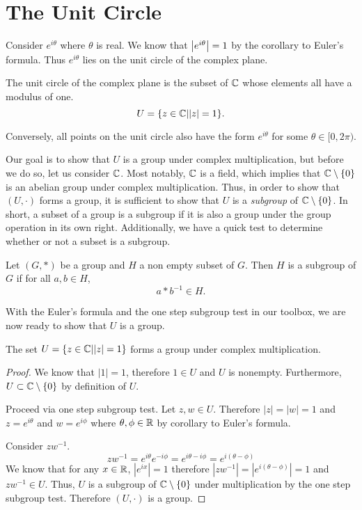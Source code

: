 \documentclass[notitlepage]{simple}
\begin{document}
\section{The Unit Circle}

Consider $e^{i\theta}$ where $\theta$ is real.
We know that $\left| e^{i\theta} \right|=1$ by the corollary to Euler's formula.
Thus $e^{i\theta}$ lies on the unit circle of the complex plane.
\begin{definition}
	The unit circle of the complex plane is the subset of $\mathbb{C}$ whose elements all have a modulus of one.
	\[
		U = \lbrace z\in\mathbb{C} | |z|=1 \rbrace.
	\]
\end{definition}
Conversely, all points on the unit circle also have the form $e^{i\theta}$ for some $\theta\in[0,2\pi)$.

Our goal is to show that $U$ is a group under complex multiplication, but before we do so, let us consider $\mathbb{C}$.
Most notably, $\mathbb{C}$ is a field, which implies that $\mathbb{C}\setminus\lbrace 0 \rbrace$ is an abelian group under complex multiplication.
Thus, in order to show that $(U,\cdot)$ forms a group, it is sufficient to show that $U$ is a \textit{subgroup} of $\mathbb{C}\setminus\lbrace 0 \rbrace$.
In short, a subset of a group is a subgroup if it is also a group under the group operation in its own right.
Additionally, we have a quick test to determine whether or not a subset is a subgroup.

\begin{proposition}
	Let $(G,*)$ be a group and $H$ a non empty subset of $G$.
	Then $H$ is a subgroup of $G$ if for all $a,b\in H$,
	\[
		a*b^{-1}\in H.
	\]
\end{proposition}

With the Euler's formula and the one step subgroup test in our toolbox, we are now ready to show that $U$ is a group.

\begin{thm}
	The set $U = \lbrace z\in\mathbb{C} | |z|=1 \rbrace$ forms a group under complex multiplication.
\end{thm}
\begin{proof}
	We know that $|1|=1$, therefore $1\in U$ and $U$ is nonempty.
	Furthermore, $U\subset\mathbb{C}\setminus\lbrace 0 \rbrace$ by definition of $U$.

	Proceed via one step subgroup test.
	Let $z,w\in U$.
	Therefore $|z|=|w|=1$ and $z=e^{i\theta}$ and $w=e^{i\phi}$ where $\theta,\phi\in\mathbb{R}$ by corollary to Euler's formula.

	Consider $zw^{-1}$.
	\[
		zw^{-1} = e^{i\theta}e^{-i\phi} = e^{i\theta - i\phi} = e^{i(\theta -\phi)}
	\]
	We know that for any $x\in\mathbb{R}$, $|e^{ix}|=1$ therefore $|zw^{-1}|=|e^{i(\theta - \phi)}|=1$ and $zw^{-1}\in U$.
	Thus, $U$ is a subgroup of $\mathbb{C}\setminus\lbrace 0 \rbrace$ under multiplication by the one step subgroup test.
	Therefore $(U,\cdot)$ is a group.
\end{proof}
\end{document}
